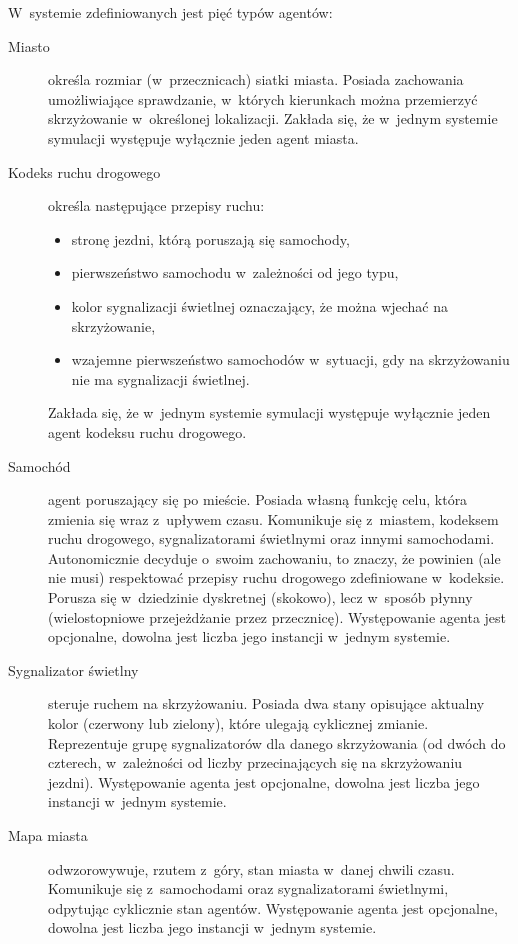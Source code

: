 \documentclass[a4paper,11pt]{article}
\begin{document}
W~systemie zdefiniowanych jest pięć typów agentów:

\begin{description}
    \item[Miasto] określa rozmiar (w~przecznicach) siatki miasta. Posiada zachowania umożliwiające sprawdzanie, w~których kierunkach można przemierzyć skrzyżowanie w~określonej lokalizacji. Zakłada się, że w~jednym systemie symulacji występuje wyłącznie jeden agent miasta.
    \item[Kodeks ruchu drogowego] określa następujące przepisy ruchu:
        \begin{itemize}
            \item stronę jezdni, którą poruszają się samochody,
            \item pierwszeństwo samochodu w~zależności od jego typu,
            \item kolor sygnalizacji świetlnej oznaczający, że można wjechać na skrzyżowanie,
            \item wzajemne pierwszeństwo samochodów w~sytuacji, gdy na skrzyżowaniu nie ma sygnalizacji świetlnej.
        \end{itemize}
        
        Zakłada się, że w~jednym systemie symulacji występuje wyłącznie jeden agent kodeksu ruchu drogowego.
    \item[Samochód] agent poruszający się po mieście. Posiada własną funkcję celu, która zmienia się wraz z~upływem czasu. Komunikuje się z~miastem, kodeksem ruchu drogowego, sygnalizatorami świetlnymi oraz innymi samochodami. Autonomicznie decyduje o~swoim zachowaniu, to znaczy, że powinien (ale nie musi) respektować przepisy ruchu drogowego zdefiniowane w~kodeksie. Porusza się w~dziedzinie dyskretnej (skokowo), lecz w~sposób płynny (wielostopniowe przejeżdżanie przez przecznicę). Występowanie agenta jest opcjonalne, dowolna jest liczba jego instancji w~jednym systemie.
    \item[Sygnalizator świetlny] steruje ruchem na skrzyżowaniu. Posiada dwa stany opisujące aktualny kolor (czerwony lub zielony), które ulegają cyklicznej zmianie. Reprezentuje grupę sygnalizatorów dla danego skrzyżowania (od dwóch do czterech, w~zależności od liczby przecinających się na skrzyżowaniu jezdni). Występowanie agenta jest opcjonalne, dowolna jest liczba jego instancji w~jednym systemie.
    \item[Mapa miasta] odwzorowywuje, rzutem z~góry, stan miasta w~danej chwili czasu. Komunikuje się z~samochodami oraz sygnalizatorami świetlnymi, odpytując cyklicznie stan agentów. Występowanie agenta jest opcjonalne, dowolna jest liczba jego instancji w~jednym systemie.
\end{description}
\end{document}
